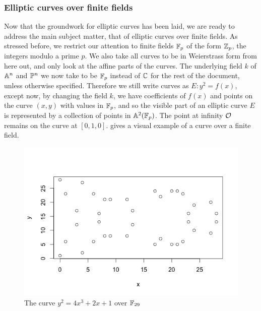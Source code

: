 \subsubsection{Elliptic curves over finite fields}
Now that the groundwork for elliptic curves has been laid, we are ready to address the main subject matter, that of elliptic curves over finite fields.
As stressed before, we restrict our attention to finite fields $\fp$ of the form $\zn[p]$, the integers modulo a prime $p$.
We also take all curves to be in Weierstrass form from here out, and only look at the affine parts of the curves.
The underlying field $k$ of $\an$ and $\pn$ we now take to be $\fp$ instead of $\C$ for the rest of the document, unless otherwise specified.
% 
% 
% 
% 
% 
Therefore we still write curves as $E:y^2=f(x)$, except now, by changing the field $k$, we have coefficients of $f(x)$ and points on the curve $(x,y)$ with values in $\fp$, and so the visible part of an elliptic curve $E$ is represented by a collection of points in $\an[2](\fp)$.
The point at infinity $\pai$ remains on the curve at $[0,1,0]$.
 gives a visual example of a curve over a finite field.
\begin{figure}[htbp]
	\centering
	\includegraphics[scale=0.5]{../Figures/finiteellipticcurve.png}
	\caption{The curve $y^2 = 4x^3 + 2x + 1$ over $\fp[29]$}
	\label{finitecurve}
\end{figure}
